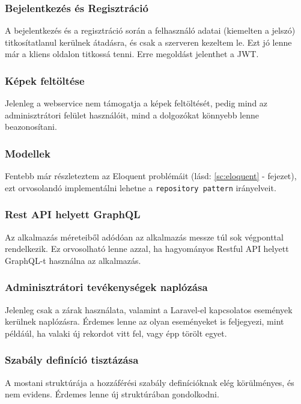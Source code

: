 \documentclass[a4paper,12pt]{thesis-ekf}
\theoremstyle{definition}
\begin{document}
		\subsubsection*{Bejelentkezés és Regisztráció}
			A bejelentkezés és a regisztráció során a felhasználó adatai (kiemelten a jelszó) titkosítatlanul kerülnek átadásra, és csak a szerveren kezeltem le. Ezt jó lenne már a kliens oldalon titkossá tenni. Erre megoldást jelenthet a JWT.
			
		\subsubsection*{Képek feltöltése}
			Jelenleg a webservice nem támogatja a képek feltöltését, pedig mind az adminisztrátori felület használóit, mind a dolgozókat könnyebb lenne beazonosítani.
		
		\subsubsection*{Modellek}
			Fentebb már részleteztem az Eloquent problémáit (lásd: \ref{sc:eloquent} -  fejezet), ezt orvosolandó implementálni lehetne a \texttt{repository pattern} irányelveit.
		
		\subsubsection*{Rest API helyett GraphQL}
			Az alkalmazás méreteiből adódóan az alkalmazás messze túl sok végponttal rendelkezik. Ez orvosolható lenne azzal, ha hagyományos Restful API helyett GraphQL-t használna az alkalmazás.
		
		\subsubsection*{Adminisztrátori tevékenységek naplózása}
			Jelenleg csak a zárak használata, valamint a Laravel-el kapcsolatos események kerülnek naplózásra. Érdemes lenne az olyan eseményeket is feljegyezi, mint példáúl, ha valaki új rekordot vitt fel, vagy épp törölt egyet.
			
		\subsubsection*{Szabály definíció tisztázása}
			A mostani struktúrája a hozzáférési szabály definícióknak elég körülményes, és nem evidens. Érdemes lenne új struktúrában gondolkodni.
			
\end{document}
